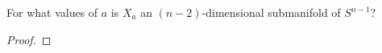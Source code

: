 \documentclass[../psets.tex]{subfiles}
\begin{document}
\begin{enumerate}[label={\textbf{4.1.\roman*.}}]
    For what values of $a$ is $X_a$ an $(n-2)$-dimensional submanifold of $S^{n-1}$?
    \begin{proof}





\end{proof}
\end{enumerate}
\end{document}
